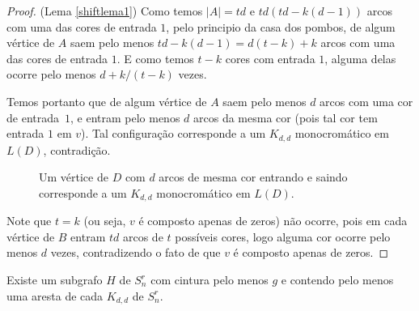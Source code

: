 \begin{proof}{(Lema \ref{shiftlema1})}
Como temos $|A| = td$ e $td(td - k(d-1))$ arcos com uma das cores de entrada $1$, pelo principio da casa dos pombos, de algum vértice de $A$ saem pelo menos $td - k(d-1) = d(t-k) + k$ arcos com uma das cores de entrada $1$. E como temos $t-k$ cores com entrada $1$, alguma delas ocorre pelo menos $d + k/(t-k)$ vezes. 

Temos portanto que de algum vértice de $A$ saem pelo menos $d$ arcos com uma cor de entrada~$1$, e entram pelo menos $d$ arcos da mesma cor (pois tal cor tem entrada $1$ em $v$). Tal configuração corresponde a um $K_{d,d}$ monocromático em $L(D)$, contradição.

\begin{figure}[H]
\centering
{}
\caption{Um vértice de $D$ com $d$ arcos de mesma cor entrando e saindo corresponde a um $K_{d,d}$ monocromático em $L(D)$.}
\label{fig:shiftkdd}
\end{figure}

Note que $t=k$ (ou seja, $v$ é composto apenas de zeros) não ocorre, pois em cada vértice de $B$ entram $td$ arcos de $t$ possíveis cores, logo alguma cor ocorre pelo menos $d$ vezes, contradizendo o fato de que $v$ é composto apenas de zeros.
\end{proof}

\begin{lema}\label{shiftlema2}
Existe um subgrafo $H$ de $S_n^r$ com cintura pelo menos $g$ e contendo pelo menos uma aresta de cada $K_{d,d}$ de $S_n^r$.
\end{lema}

